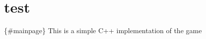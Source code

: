 \chapter{test }
\hypertarget{md_src_2test}{}\label{md_src_2test}
 \{\#mainpage\} This is a simple C++ implementation of the game 